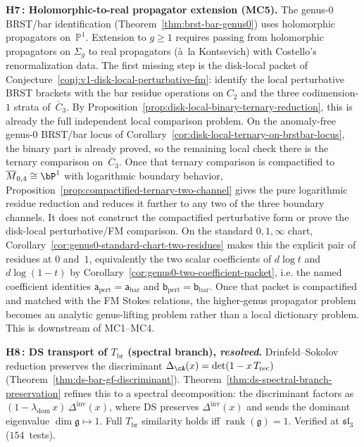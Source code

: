 \begin{remark}
\smallskip\noindent
\textbf{H7\,: Holomorphic-to-real propagator extension (MC5).}
The genus-$0$ BRST/bar identification
(Theorem~\ref{thm:brst-bar-genus0}) uses holomorphic propagators
on~$\mathbb{P}^1$. Extension to $g \geq 1$ requires passing from
holomorphic propagators on $\Sigma_g$ to real propagators
(\`a~la Kontsevich) with Costello's renormalization data.
The first missing step is the disk-local packet of
Conjecture~\ref{conj:v1-disk-local-perturbative-fm}: identify the local
perturbative BRST brackets with the bar residue operations on
$C_2$ and the three codimension-$1$ strata of~$\overline{C}_3$.
By Proposition~\ref{prop:disk-local-binary-ternary-reduction}, this is
already the full independent local comparison problem.
On the anomaly-free genus-$0$ BRST/bar locus of
Corollary~\ref{cor:disk-local-ternary-on-brstbar-locus}, the binary
part is already proved, so the remaining local check there is the
ternary comparison on~$\overline{C}_3$.
Once that ternary comparison is compactified to
$\overline{M}_{0,4} \cong \bP^1$ with logarithmic boundary behavior,
Proposition~\ref{prop:compactified-ternary-two-channel} gives the
pure logarithmic residue reduction and reduces it further to any two
of the three boundary channels. It does not construct the
compactified perturbative form or prove the disk-local
perturbative/FM comparison. On the standard
$0,1,\infty$ chart,
Corollary~\ref{cor:genus0-standard-chart-two-residues} makes this the
explicit pair of residues at $0$ and~$1$, equivalently the two scalar
coefficients of $d\log t$ and $d\log(1-t)$ by
Corollary~\ref{cor:genus0-two-coefficient-packet}, i.e. the named
coefficient identities
\(\mathsf{a}_{\mathrm{pert}}=\mathsf{a}_{\mathrm{bar}}\) and
\(\mathsf{b}_{\mathrm{pert}}=\mathsf{b}_{\mathrm{bar}}\).
Once that packet is compactified and matched with the FM Stokes
relations, the higher-genus propagator problem becomes an analytic
genus-lifting problem rather than a local dictionary problem.
This is downstream of MC1--MC4.

\smallskip\noindent
\textbf{H8\,: DS transport of $T_{\mathrm{br}}$ (spectral branch),
\emph{resolved}.}
Drinfeld--Sokolov reduction preserves the discriminant
$\Delta_{\cA}(x) = \det(1 - x \, T_{\mathrm{rec}})$
(Theorem~\ref{thm:ds-bar-gf-discriminant}).
Theorem~\ref{thm:ds-spectral-branch-preservation} refines
this to a spectral decomposition: the discriminant factors as
$(1 - \lambda_{\mathrm{dom}}\,x)\,\Delta^{\mathrm{inv}}(x)$,
where DS preserves $\Delta^{\mathrm{inv}}(x)$ and sends the
dominant eigenvalue $\dim\mathfrak{g} \mapsto 1$. Full
$T_{\mathrm{br}}$ similarity holds iff
$\operatorname{rank}(\mathfrak{g}) = 1$. Verified at
$\mathfrak{sl}_3$ ($154$~tests).
\end{remark}

